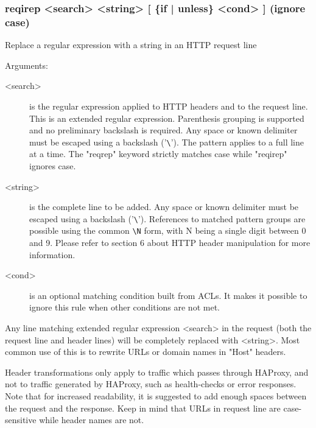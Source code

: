 {\subsubsection[reqirep]{reqirep <search> <string> [ \{if | unless\} <cond> ] (ignore case)}


  Replace a regular expression with a string in an HTTP request line

 
  Arguments:
  \begin{description}
  \item[<search>] is the regular expression applied to HTTP headers and to the
              request line. This is an extended regular expression. Parenthesis
              grouping is supported and no preliminary backslash is required.
              Any space or known delimiter must be escaped using a backslash
              ('\verb|\|'). The pattern applies to a full line at a time. The "reqrep"
              keyword strictly matches case while "reqirep" ignores case.

  \item[<string>] is the complete line to be added. Any space or known delimiter
              must be escaped using a backslash ('\verb|\|'). References to matched
              pattern groups are possible using the common \verb|\N| form, with N
              being a single digit between 0 and 9. Please refer to section
              6 about HTTP header manipulation for more information.

  \item[<cond>] is an optional matching condition built from ACLs. It makes it
              possible to ignore this rule when other conditions are not met.
  \end{description}

  Any line matching extended regular expression <search> in the request (both
  the request line and header lines) will be completely replaced with <string>.
  Most common use of this is to rewrite URLs or domain names in "Host" headers.

  Header transformations only apply to traffic which passes through HAProxy,
  and not to traffic generated by HAProxy, such as health-checks or error
  responses. Note that for increased readability, it is suggested to add enough
  spaces between the request and the response. Keep in mind that URLs in
  request line are case-sensitive while header names are not.

}
